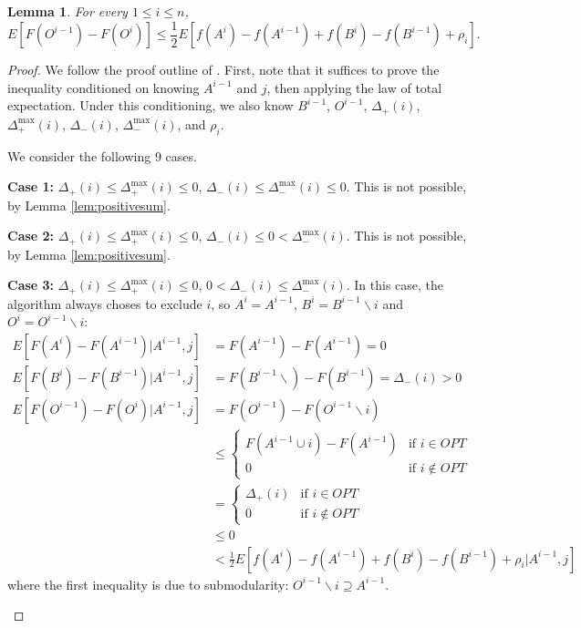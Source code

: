 \documentclass{article} %
\newtheorem{lem}[thm]{Lemma}
\begin{document}
\begin{lem}\label{lem:singleelement} For every $1 \leq i \leq n$,
\[E[F(O^{i-1})-F(O^i)] \leq \frac{1}{2} E[f(A^i) - f(A^{i-1}) + f(B^i) - f(B^{i-1}) + \rho_i].\]
\end{lem}
\begin{proof}
We follow the proof outline of \cite{buchbinder2012}.
First, note that it suffices to prove the inequality conditioned on knowing $A^{i-1}$ and $j$, then applying the law of total expectation.
Under this conditioning, we also know $B^{i-1}$, $O^{i-1}$, $\Delta_+(i)$, $\Delta_+^{\max}(i)$, $\Delta_-(i)$, $\Delta_-^{\max}(i)$, and $\rho_i$.

We consider the following 9 cases.

\begin{description}
\item\textbf{Case 1:} $\Delta_+(i) \leq \Delta_+^{\max}(i) \leq 0$, $\Delta_-(i) \leq \Delta_-^{\max}(i) \leq 0$.
This is not possible, by Lemma \ref{lem:positivesum}.

\item\textbf{Case 2:} $\Delta_+(i) \leq \Delta_+^{\max}(i) \leq 0$, $\Delta_-(i) \leq 0 < \Delta_-^{\max}(i)$.
This is not possible, by Lemma \ref{lem:positivesum}.

\item\textbf{Case 3:} $\Delta_+(i) \leq \Delta_+^{\max}(i) \leq 0$, $0 < \Delta_-(i) \leq \Delta_-^{\max}(i)$.
In this case, the algorithm always choses to exclude $i$, so $A^i = A^{i-1}$, $B^i = B^{i-1} \backslash i$ and $O^i = O^{i-1} \backslash i$:
\begin{align*}
E[F(A^i) - F(A^{i-1}) | A^{i-1}, j] &= F(A^{i-1}) - F(A^{i-1}) = 0\\
E[F(B^i) - F(B^{i-1}) | A^{i-1}, j] &= F(B^{i-1} \backslash) - F(B^{i-1}) = \Delta_-(i) > 0\\
E[F(O^{i-1}) - F(O^i) | A^{i-1}, j] &= F(O^{i-1}) - F(O^{i-1} \backslash i) \\
&\leq \begin{cases}F(A^{i-1} \cup i) - F(A^{i-1}) & \text{if $i\in OPT$} \\ 0 & \text{if $i\not\in OPT$}\end{cases}\\
&= \begin{cases}\Delta_+(i) & \text{if $i\in OPT$} \\ 0 & \text{if $i\not\in OPT$}\end{cases}\\
&\leq 0\\
&< \frac{1}{2} E[f(A^i) - f(A^{i-1}) + f(B^i) - f(B^{i-1}) + \rho_i | A^{i-1},j]
\end{align*}
where the first inequality is due to submodularity: $O^{i-1}\backslash i \supseteq A^{i-1}$.


\end{description}
\end{proof}
\end{document}
